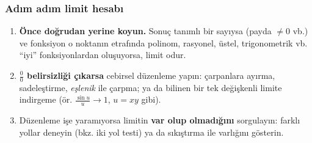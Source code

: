 \subsubsection{Adım adım limit hesabı}

\begin{enumerate}
  \item \textbf{Önce doğrudan yerine koyun.} Sonuç tanımlı bir sayıysa (payda $\neq0$ vb.) ve fonksiyon o noktanın
        etrafında polinom, rasyonel, üstel, trigonometrik vb. ``iyi'' fonksiyonlardan oluşuyorsa, limit odur.
  \item \textbf{$\frac00$ belirsizliği çıkarsa} cebirsel düzenleme yapın: çarpanlara ayırma, sadeleştirme, \emph{eşlenik}
        ile çarpma; ya da bilinen bir tek değişkenli limite indirgeme (ör. $\frac{\sin u}{u}\to1$, $u=xy$ gibi).
  \item Düzenleme işe yaramıyorsa limitin \textbf{var olup olmadığını} sorgulayın: farklı yollar deneyin (bkz. iki yol
        testi) ya da sıkıştırma ile varlığını gösterin.
\end{enumerate}

